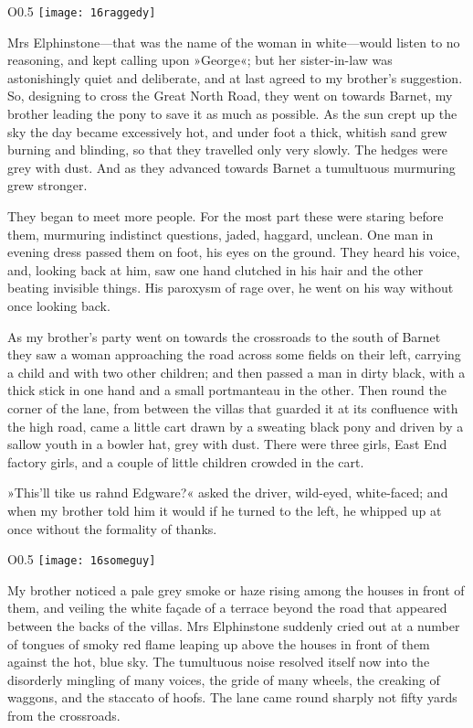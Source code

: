 \begin{wrapfigure}{O}{0.5\textwidth}
\centering
\texttt{[image: 16raggedy]}
\end{wrapfigure}

Mrs Elphinstone—that was the name of the woman in white—would listen to no reasoning, and kept calling upon »George«; but her sister-in-law was astonishingly quiet and deliberate, and at last agreed to my brother's suggestion. So, designing to cross the Great North Road, they went on towards Barnet, my brother leading the pony to save it as much as possible. As the sun crept up the sky the day became excessively hot, and under foot a thick, whitish sand grew burning and blinding, so that they travelled only very slowly. The hedges were grey with dust. And as they advanced towards Barnet a tumultuous murmuring grew stronger.

They began to meet more people. For the most part these were staring before them, murmuring indistinct questions, jaded, haggard, unclean. One man in evening dress passed them on foot, his eyes on the ground. They heard his voice, and, looking back at him, saw one hand clutched in his hair and the other beating invisible things. His paroxysm of rage over, he went on his way without once looking back.

As my brother's party went on towards the crossroads to the south of Barnet they saw a woman approaching the road across some fields on their left, carrying a child and with two other children; and then passed a man in dirty black, with a thick stick in one hand and a small portmanteau in the other. Then round the corner of the lane, from between the villas that guarded it at its confluence with the high road, came a little cart drawn by a sweating black pony and driven by a sallow youth in a bowler hat, grey with dust. There were three girls, East End factory girls, and a couple of little children crowded in the cart.

»This'll tike us rahnd Edgware?« asked the driver, wild-eyed, white-faced; and when my brother told him it would if he turned to the left, he whipped up at once without the formality of thanks.

\begin{wrapfigure}{O}{0.5\textwidth}
\centering
\texttt{[image: 16someguy]}
\end{wrapfigure}

My brother noticed a pale grey smoke or haze rising among the houses in front of them, and veiling the white façade of a terrace beyond the road that appeared between the backs of the villas. Mrs Elphinstone suddenly cried out at a number of tongues of smoky red flame leaping up above the houses in front of them against the hot, blue sky. The tumultuous noise resolved itself now into the disorderly mingling of many voices, the gride of many wheels, the creaking of waggons, and the staccato of hoofs. The lane came round sharply not fifty yards from the crossroads.

